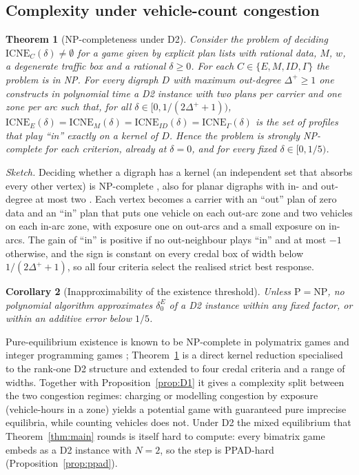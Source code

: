 \documentclass[preprint,12pt]{elsarticle}
\newtheorem{theorem}{Theorem}
\newtheorem{corollary}[theorem]{Corollary}
\theoremstyle{definition}
\theoremstyle{remark}
\newcommand{\ICNE}{\mathrm{ICNE}}
\begin{document}
\subsection{Complexity under vehicle-count congestion}

\begin{theorem}[NP-completeness under D2]\label{thm:np}
Consider the problem of deciding $\ICNE_C(\delta)\neq\emptyset$ for a game given by explicit plan lists with rational data, $M$, $w$, a degenerate traffic box and a rational $\delta\ge0$. For each $C\in\{E,M,ID,\Gamma\}$ the problem is in NP. For every digraph $D$ with maximum out-degree $\Delta^+\ge1$ one constructs in polynomial time a D2 instance with two plans per carrier and one zone per arc such that, for all $\delta\in[0,1/(2\Delta^++1))$, $\ICNE_E(\delta)=\ICNE_M(\delta)=\ICNE_{ID}(\delta)=\ICNE_\Gamma(\delta)$ is the set of profiles that play ``in'' exactly on a kernel of $D$. Hence the problem is strongly NP-complete for each criterion, already at $\delta=0$, and for every fixed $\delta\in[0,1/5)$.
\end{theorem}

\emph{Sketch.} Deciding whether a digraph has a kernel (an independent set that absorbs every other vertex) is NP-complete \citep{Chvatal1973}, also for planar digraphs with in- and out-degree at most two \citep{Fraenkel1981}. Each vertex becomes a carrier with an ``out'' plan of zero data and an ``in'' plan that puts one vehicle on each out-arc zone and two vehicles on each in-arc zone, with exposure one on out-arcs and a small exposure on in-arcs. The gain of ``in'' is positive if no out-neighbour plays ``in'' and at most $-1$ otherwise, and the sign is constant on every credal box of width below $1/(2\Delta^++1)$, so all four criteria select the realised strict best response.

\begin{corollary}[Inapproximability of the existence threshold]\label{cor:inapprox}
Unless $\mathrm P=\mathrm{NP}$, no polynomial algorithm approximates $\delta_0^E$ of a D2 instance within any fixed factor, or within an additive error below $1/5$.
\end{corollary}

Pure-equilibrium existence is known to be NP-complete in polymatrix games and integer programming games \citep{Apt2022,Carvalho2022}; Theorem~\ref{thm:np} is a direct kernel reduction specialised to the rank-one D2 structure and extended to four credal criteria and a range of widths. Together with Proposition~\ref{prop:D1} it gives a complexity split between the two congestion regimes: charging or modelling congestion by exposure (vehicle-hours in a zone) yields a potential game with guaranteed pure imprecise equilibria, while counting vehicles does not. Under D2 the mixed equilibrium that Theorem~\ref{thm:main} rounds is itself hard to compute: every bimatrix game embeds as a D2 instance with $N=2$, so the step is PPAD-hard \citep{Chen2009,Daskalakis2009} (Proposition~\ref{prop:ppad}).
\end{document}

